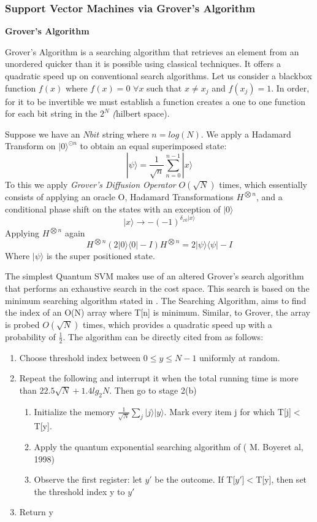 \documentclass{article}
\begin{document}
\subsubsection{Support Vector Machines via Grover's Algorithm}
\textbf{Grover's Algorithm}
\par
Grover's Algorithm is a searching algorithm that retrieves an element from an unordered quicker than it is possible using classical techniques. It offers a quadratic speed up on conventional search algorithms. Let us consider a blackbox function $f(x)$ where $f(x) = 0$ $\forall x$ such that $x\neq x_j$ and $f(x_j) = 1$. In order, for it to be invertible we must establish a function creates a one to one function for each bit string in the $2^N$ \textit(hilbert space). \par
Suppose we have an $N bit$ string where $n = log(N)$. We apply a Hadamard Transform on $|0\rangle^{\odot n}$ to obtain an equal superimposed state: 
$$|\psi\rangle = \frac{1}{\sqrt{n}}\sum_{n=0}^{n-1}|x\rangle$$
To this we apply \textit{Grover's Diffusion Operator} $O(\sqrt{N})$ times, which essentially consists of applying an oracle O, Hadamard Transformations $H^{\bigotimes n}$, and a conditional phase shift on the states with an exception of $|0\rangle$
$$|x\rangle \longrightarrow -(-1)^{\delta_{x0}|x\rangle}$$
Applying $H^{\bigotimes n}$ again
$$H^{\bigotimes n}(2|0\rangle\langle 0| - I)H^{\bigotimes n} = 2 |\psi\rangle\langle \psi| - I$$
Where $|\psi\rangle$ is the super positioned state.\cite{BOOK:6}
\par
The  simplest  Quantum  SVM  makes  use  of  an  altered  Grover’s  search algorithm that performs an exhaustive search in the cost space.  This search is based on the minimum searching algorithm stated in \cite{Article3}.  The Searching Algorithm, aims to find the index of an O(N) array where T[n] is minimum.  Similar, to Grover, the array is probed $O(\sqrt{N})$ times, which provides a quadratic speed up with a probability of $\frac{1}{2}$.  The algorithm can be directly cited from \cite{BOOK:6} as follows:
\begin{enumerate}
    \item Choose threshold index between $0\leq y \leq N-1$ uniformly at random.
    \item Repeat the following and interrupt it when the total running time is more than  $22.5\sqrt{N} + 1.4lg_2N$. Then go to stage 2(b)
    \begin{enumerate}
         \item Initialize  the  memory $\frac{1}{\sqrt{N}}\sum_j |j\rangle |y\rangle$. Mark  every  item  j  for which T[j]$<$T[y].
        \item Apply the quantum exponential searching algorithm of ( M. Boyeret al, 1998)
        \item Observe the first register: let $y'$ be the outcome.  If T[$y'$]$<$T[y], then set the threshold index y to $y'$
    \end{enumerate}
    
    \item Return y
\end{enumerate}
\end{document}
